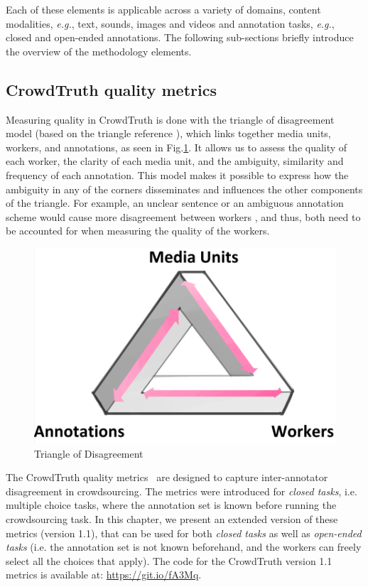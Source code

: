 Each of these elements is applicable across a variety of domains, content modalities, \emph{e.g.}, text, sounds, images and videos and annotation tasks, \emph{e.g.}, closed and open-ended annotations. The following sub-sections briefly introduce the overview of the methodology elements.

\subsection{CrowdTruth quality metrics}
\label{subsec:metrics}

Measuring quality in CrowdTruth is done with  the triangle of disagreement model (based on the triangle reference \cite{knowlton1966definition}), which links together media units, workers, and annotations, as seen in Fig.\ref{fig:triangle_of_reference}. It allows us to assess the quality of each worker, the clarity of each media unit, and the ambiguity, similarity and frequency of each annotation. This model makes it possible to express how the ambiguity in any of the corners disseminates and influences the other components of the triangle. For example, an unclear sentence or an ambiguous annotation scheme would cause more disagreement between workers \cite{aroyo2014threesides}, and thus, both need to be accounted for when measuring the quality of the workers. 

 \begin{figure}[!hpt]
 	\centering
 		\includegraphics[width=0.5\linewidth]{img/triangle.png}
 	\caption{Triangle of Disagreement}
 	\label{fig:triangle_of_reference}
 \end{figure}

The CrowdTruth quality metrics~\cite{aroyo2014threesides} are designed to capture inter-annotator disagreement in crowdsourcing. The metrics were introduced for \textit{closed tasks}, i.e. multiple choice tasks, where the annotation set is known before running the crowdsourcing task. In this chapter, we present an extended version of these metrics (version 1.1), that can be used for both \textit{closed tasks} as well as \textit{open-ended tasks} (i.e. the annotation set is not known beforehand, and the workers can freely select all the choices that apply). The code for the CrowdTruth version 1.1 metrics is available at: \url{https://git.io/fA3Mq}.

